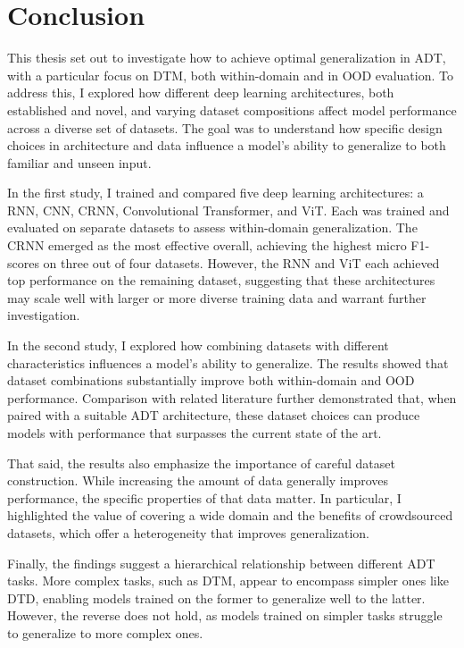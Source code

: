 \chapter{Conclusion}\label{Conclusion}

This thesis set out to investigate how to achieve optimal generalization in \acrfull{ADT}, with a particular focus on \acrfull{DTM}, both within-domain and in \acrfull{OOD} evaluation. To address this, I explored how different deep learning architectures, both established and novel, and varying dataset compositions affect model performance across a diverse set of datasets. The goal was to understand how specific design choices in architecture and data influence a model's ability to generalize to both familiar and unseen input.

In the first study, I trained and compared five deep learning architectures: a \acrfull{RNN}, \acrfull{CNN}, \acrfull{CRNN}, Convolutional Transformer, and \acrfull{ViT}. Each was trained and evaluated on separate datasets to assess within-domain generalization. The \acrlong{CRNN} emerged as the most effective overall, achieving the highest micro F1-scores on three out of four datasets. However, the \acrlong{RNN} and \acrlong{ViT} each achieved top performance on the remaining dataset, suggesting that these architectures may scale well with larger or more diverse training data and warrant further investigation.

In the second study, I explored how combining datasets with different characteristics influences a model's ability to generalize. The results showed that dataset combinations substantially improve both within-domain and \acrfull{OOD} performance. Comparison with related literature further demonstrated that, when paired with a suitable \gls{ADT} architecture, these dataset choices can produce models with performance that surpasses the current state of the art.

That said, the results also emphasize the importance of careful dataset construction. While increasing the amount of data generally improves performance, the specific properties of that data matter. In particular, I highlighted the value of covering a wide domain and the benefits of crowdsourced datasets, which offer a heterogeneity that improves generalization. 

Finally, the findings suggest a hierarchical relationship between different \gls{ADT} tasks. More complex tasks, such as \gls{DTM}, appear to encompass simpler ones like \gls{DTD}, enabling models trained on the former to generalize well to the latter. However, the reverse does not hold, as models trained on simpler tasks struggle to generalize to more complex ones.


